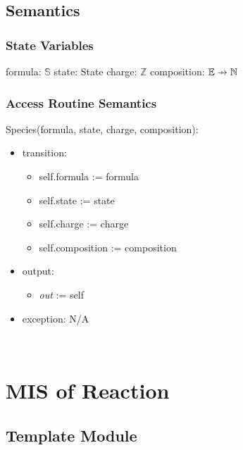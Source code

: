 \documentclass[12pt, titlepage]{article}
\newcommand\pfun{\mathrel{\ooalign{\hfil$\mapstochar\mkern5mu$\hfil\cr$\to$\cr}}}
\begin{document}
\subsection{Semantics}

\subsubsection{State Variables}
formula:  $\mathbb{S}$
\newline state:  State
\newline charge:  $\mathbb{Z}$
\newline composition: $\mathbb{E} \pfun \mathbb{N}$


\subsubsection{Access Routine Semantics}

\noindent Species(formula, state, charge, composition):
\begin{itemize}
\item transition: \begin{itemize} 
                  \item[] self.formula := formula
                  \item[] self.state := state
                  \item[] self.charge := charge
                  \item[] self.composition := composition
                  \end{itemize}
\item output: \begin{itemize} 
              \item[] \emph{out} := self 
              \end{itemize}
\item exception: N/A
\end{itemize}


~\newpage


\section{MIS of Reaction} \label{Module:Reaction}

\subsection{Template Module}
\end{document}
